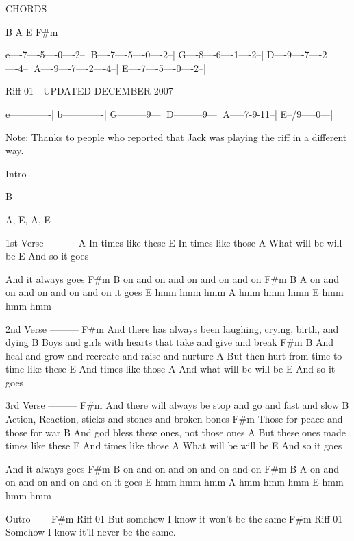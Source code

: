 CHORDS

     B    A    E   F#m

e----7----5----0----2--|
B----7----5----0----2--|
G----8----6----1----2--|
D----9----7----2----4--|
A----9----7----2----4--|
E----7----5----0----2--|

Riff 01 - UPDATED DECEMBER 2007

e-------------|
b-------------|
G---------9---|
D---------9---|
A-----7-9-11--|
E--/9-----0---|

Note: Thanks to people who reported that Jack was playing
the riff in a different way.


Intro
-----

B

A, E, A, E

1st Verse
---------
            A
In times like these
               E  
In times like those
                A  
What will be will be
            E 
And so it goes

And it always goes 
F#m            B
on and on and on and on and on
F#m            B                  A
on and on and on and on and on it goes
        E
hmm hmm hmm
        A
hmm hmm hmm
        E
hmm hmm hmm



2nd Verse
---------
                          F#m              
And there has always been laughing, crying, birth, and dying
 B
Boys and girls with hearts that take and give and break
     F#m                                     B
And heal and grow and recreate and raise and nurture
                                     A
But then hurt from time to time like these
               E
And times like those
                      A
And what will be will be
          E
And so it goes


3rd Verse
---------
                         F#m
And there will always be stop and go and fast and slow
         B
Action, Reaction, sticks and stones and broken bones
F#m
Those for peace and those for war
              B
And god bless these ones, not those ones
                          A
But these ones made times like these
              E
And times like those
                  A
What will be will be
       E
And so it goes


And it always goes 
F#m            B
on and on and on and on and on
F#m            B                  A
on and on and on and on and on it goes
        E
hmm hmm hmm
        A
hmm hmm hmm
        E
hmm hmm hmm


Outro
-----
           F#m        Riff 01      
But somehow I know it won't be the same
           F#m        Riff 01       
Somehow I know it'll never be the same.


